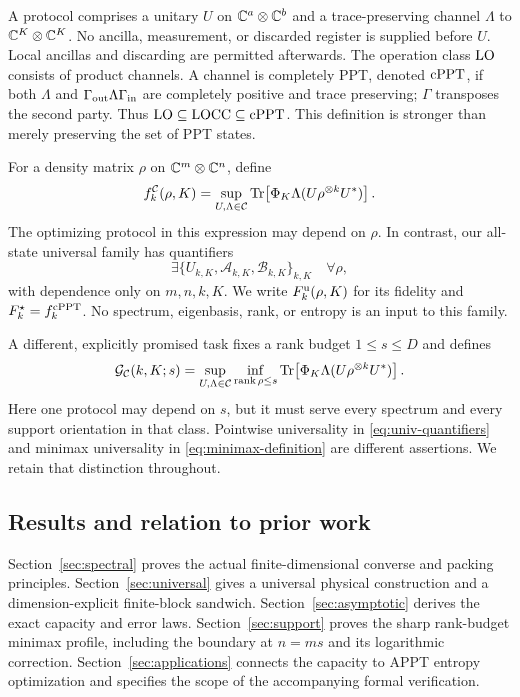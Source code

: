 A protocol comprises a unitary $U$ on $\mathbb C^a\otimes\mathbb C^b$ and a trace-preserving channel $\Lambda$ to $\mathbb C^K\otimes\mathbb C^K$. No ancilla, measurement, or discarded register is supplied before $U$. Local ancillas and discarding are permitted afterwards. The operation class $\mathrm{LO}$ consists of product channels. A channel is completely PPT, denoted $\mathrm{cPPT}$, if both $\Lambda$ and $\Gamma_{\rm out}\Lambda\Gamma_{\rm in}$ are completely positive and trace preserving; $\Gamma$ transposes the second party. Thus $\mathrm{LO}\subseteq\mathrm{LOCC}\subseteq\mathrm{cPPT}$. This definition is stronger than merely preserving the set of PPT states.

For a density matrix $\rho$ on $\mathbb C^m\otimes\mathbb C^n$, define
\begin{equation}\label{eq:state-aware}
 f_k^{\mathcal C}(\rho,K)=\sup_{U,\Lambda\in\mathcal C}
 \operatorname{Tr}\!\left[\Phi_K\Lambda(U\rho^{\otimes k}U^*)\right].
\end{equation}
The optimizing protocol in this expression may depend on $\rho$. In contrast, our all-state universal family has quantifiers
\begin{equation}\label{eq:univ-quantifiers}
 \exists\{U_{k,K},\mathcal A_{k,K},\mathcal B_{k,K}\}_{k,K}
 \quad\forall\rho,
\end{equation}
with dependence only on $m,n,k,K$. We write $F_k^{\rm u}(\rho,K)$ for its fidelity and $F_k^\star=f_k^{\mathrm{cPPT}}$. No spectrum, eigenbasis, rank, or entropy is an input to this family.

A different, explicitly promised task fixes a rank budget $1\le s\le D$ and defines
\begin{equation}\label{eq:minimax-definition}
 \mathcal G_{\mathcal C}(k,K;s)=\sup_{U,\Lambda\in\mathcal C}
 \inf_{\operatorname{rank}\rho\le s}\operatorname{Tr}\!\left[\Phi_K\Lambda(U\rho^{\otimes k}U^*)\right].
\end{equation}
Here one protocol may depend on $s$, but it must serve every spectrum and every support orientation in that class. Pointwise universality in \eqref{eq:univ-quantifiers} and minimax universality in \eqref{eq:minimax-definition} are different assertions. We retain that distinction throughout.

\subsection{Results and relation to prior work}
Section~\ref{sec:spectral} proves the actual finite-dimensional converse and packing principles. Section~\ref{sec:universal} gives a universal physical construction and a dimension-explicit finite-block sandwich. Section~\ref{sec:asymptotic} derives the exact capacity and error laws. Section~\ref{sec:support} proves the sharp rank-budget minimax profile, including the boundary at $n=ms$ and its logarithmic correction. Section~\ref{sec:applications} connects the capacity to APPT entropy optimization and specifies the scope of the accompanying formal verification.

